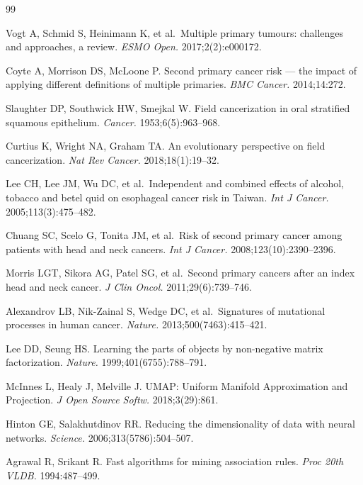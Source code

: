 \documentclass[review,12pt]{elsarticle}
\begin{document}
\begin{thebibliography}{99}

Vogt A, Schmid S, Heinimann K, et al.\ Multiple primary tumours: challenges
and approaches, a review. \textit{ESMO Open.} 2017;2(2):e000172.

Coyte A, Morrison DS, McLoone P. Second primary cancer risk --- the impact of
applying different definitions of multiple primaries.
\textit{BMC Cancer.} 2014;14:272.

Slaughter DP, Southwick HW, Smejkal W. Field cancerization in oral stratified
squamous epithelium. \textit{Cancer.} 1953;6(5):963--968.

Curtius K, Wright NA, Graham TA. An evolutionary perspective on field
cancerization. \textit{Nat Rev Cancer.} 2018;18(1):19--32.

Lee CH, Lee JM, Wu DC, et al.\ Independent and combined effects of alcohol,
tobacco and betel quid on esophageal cancer risk in Taiwan.
\textit{Int J Cancer.} 2005;113(3):475--482.

Chuang SC, Scelo G, Tonita JM, et al.\ Risk of second primary cancer among
patients with head and neck cancers.
\textit{Int J Cancer.} 2008;123(10):2390--2396.

Morris LGT, Sikora AG, Patel SG, et al.\ Second primary cancers after an
index head and neck cancer.
\textit{J Clin Oncol.} 2011;29(6):739--746.

Alexandrov LB, Nik-Zainal S, Wedge DC, et al.\ Signatures of mutational
processes in human cancer. \textit{Nature.} 2013;500(7463):415--421.

Lee DD, Seung HS. Learning the parts of objects by non-negative matrix
factorization. \textit{Nature.} 1999;401(6755):788--791.

McInnes L, Healy J, Melville J. UMAP: Uniform Manifold Approximation and
Projection. \textit{J Open Source Softw.} 2018;3(29):861.

Hinton GE, Salakhutdinov RR. Reducing the dimensionality of data with neural
networks. \textit{Science.} 2006;313(5786):504--507.

Agrawal R, Srikant R. Fast algorithms for mining association rules.
\textit{Proc 20th VLDB.} 1994:487--499.


\end{thebibliography}
\end{document}
